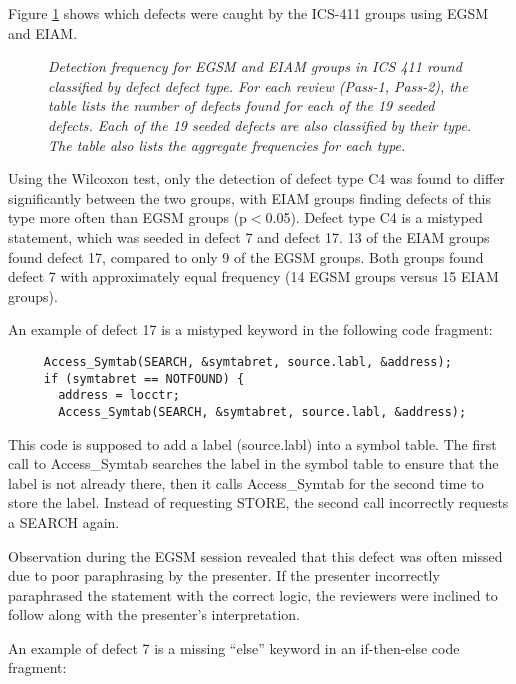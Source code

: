 Figure \ref{fig:class-results} shows which defects were caught by the
ICS-411 groups using EGSM and EIAM. 


\begin{figure}[t]
 {\centerline{}}
 \caption{{\em Detection frequency for EGSM and EIAM groups in ICS 411
 round classified by defect 
          defect type. For each review (Pass-1, Pass-2), the table lists the number of
          defects found for each of the 19 seeded defects. Each of the 19
          seeded defects are also classified by their type.  The table also
          lists the aggregate frequencies for each type.
 }}
 \label{fig:class-results}
\end{figure}


Using the Wilcoxon test, only the detection of defect type C4 was found to
differ significantly between the two groups, with EIAM groups finding
defects of this type more often than EGSM groups (p$<$0.05).
Defect type C4 is a mistyped statement, which was seeded in defect 7 and
defect 17.  13 of the EIAM groups found defect 17, compared to only 9 of
the EGSM groups. Both groups found defect 7 with approximately equal
frequency (14 EGSM groups versus 15 EIAM groups).

An example of defect 17 is a mistyped keyword in the
following code fragment:

\small
{}
\begin{verbatim}
     Access_Symtab(SEARCH, &symtabret, source.labl, &address);
     if (symtabret == NOTFOUND) {
       address = locctr;
       Access_Symtab(SEARCH, &symtabret, source.labl, &address);
\end{verbatim}
\normalsize

This code is supposed to add a label (source.labl) into a symbol table.
The first call to Access\_Symtab searches the label in the symbol table
to ensure that the label is not already there, then it calls
Access\_Symtab for the second time to store the label.  Instead of
requesting STORE, the second call incorrectly requests a SEARCH again.


Observation during the EGSM session revealed that this defect was often
missed due to poor paraphrasing by the presenter. If the presenter
incorrectly paraphrased the statement with the correct logic, the reviewers
were inclined to follow along with the presenter's interpretation.
                               
An example of defect 7 is a missing ``else'' keyword in an 
if-then-else code fragment:

